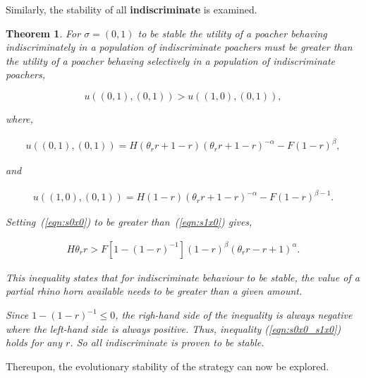 \documentclass[10pt]{article}
\newtheorem{theorem}{Theorem}
\begin{document}
Similarly, the stability of all \textbf{indiscriminate} is examined.

\begin{theorem}
	For \(\sigma=(0, 1)\) to be stable the utility of a poacher behaving 
	indiscriminately in a population of indiscriminate poachers must be greater
	than the utility of a poacher behaving selectively in a population of 
	indiscriminate poachers,

	\begin{equation}
	u((0, 1),(0, 1)) > u((1, 0),(0, 1)),
	\end{equation}

	where,

	\begin{eqnarray}
	\label{eqn:s0x0}
 	u((0, 1), (0, 1)) = H(\theta_r r + 1 - r)(\theta_r r + 1 - r)^{-\alpha}  - F(1 - r)^{\beta},
	\end{eqnarray}

	and 

	\begin{eqnarray}
	\label{eqn:s1x0}
	u((1, 0),(0, 1)) = H(1 - r)(\theta_r r + 1 - r)^{-\alpha} - F(1 - r)^{\beta-1}.
	\end{eqnarray}

	Setting~(\ref{eqn:s0x0}) to be greater than~(\ref{eqn:s1x0}) gives,

	\begin{eqnarray}
	\label{eqn:s0x0_s1x0}
	H \theta_r r  > F [1 - (1 - r)^{-1}](1 - r)^{\beta}(\theta_r r - r + 1)^{\alpha}.
	\end{eqnarray}

	This inequality states that for indiscriminate behaviour to be stable, the value of
	a partial rhino horn available needs to be greater than a given amount. 

	Since \(1-(1-r)^{-1} \leq 0\), the righ-hand side of the inequality is always
	negative where the left-hand side is always positive. Thus, inequality 
	(\ref{eqn:s0x0_s1x0}) holds for any \(r\). So all indiscriminate
	is proven to be stable.
\end{theorem}

Thereupon, the evolutionary stability of the strategy can now be explored. 
\end{document}
